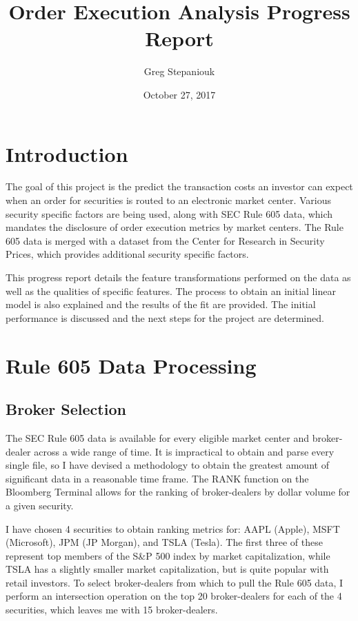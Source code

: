 \documentclass{article}
\title{Order Execution Analysis Progress Report}
\author{Greg Stepaniouk}
\date{October 27, 2017}
\begin{document}
\maketitle

\begin{multicols}{2}
\section{Introduction}
\setlength{\parindent}{1cm}
The goal of this project is the predict the transaction costs an investor can expect when an order for securities is routed to an electronic market center. Various security specific factors are being used, along with SEC Rule 605 data, which mandates the disclosure of order execution metrics by market centers. The Rule 605 data is merged with a dataset from the Center for Research in Security Prices, which provides additional security specific factors.
\par This progress report details the feature transformations performed on the data as well as the qualities of specific features. The process to obtain an initial linear model is also explained and the results of the fit are provided. The initial performance is discussed and the next steps for the project are determined.

\section{Rule 605 Data Processing}
\setlength{\parindent}{1cm}
\subsection{Broker Selection}
\par
The SEC Rule 605 data is available for every eligible market center and broker-dealer across a wide range of time. It is impractical to obtain and parse every single file, so I have devised a methodology to obtain the greatest amount of significant data in a reasonable time frame. The RANK function on the Bloomberg Terminal allows for the ranking of broker-dealers by dollar volume for a given security. 
\par
\par
I have chosen 4 securities to obtain ranking metrics for: AAPL (Apple), MSFT (Microsoft), JPM (JP Morgan), and TSLA (Tesla). The first three of these represent top members of the S\&P 500 index by market capitalization, while TSLA has a slightly smaller market capitalization, but is quite popular with retail investors. To select broker-dealers from which to pull the Rule 605 data, I perform an intersection operation on the top 20 broker-dealers for each of the 4 securities, which leaves me with 15 broker-dealers. 
\par

\end{multicols}
\end{document}
